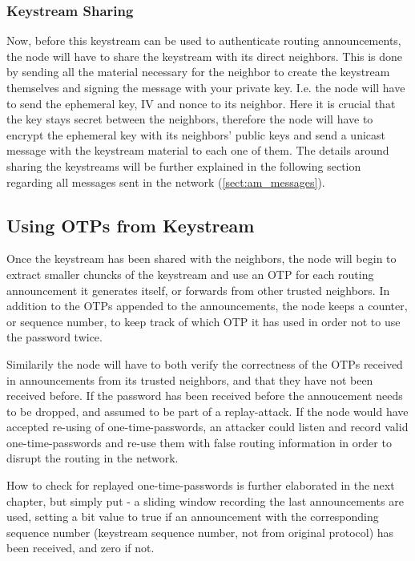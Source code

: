 \subsubsection*{Keystream Sharing}
Now, before this keystream can be used to authenticate routing announcements,
the node will have to share the keystream with its direct neighbors. This is
done by sending all the material necessary for the neighbor to create the
keystream themselves and signing the message with your private key. I.e. the
node will have to send the ephemeral key, \ac{IV} and nonce to its neighbor.
Here it is crucial that the key stays secret between the neighbors, therefore
the node will have to encrypt the ephemeral key with its neighbors' public keys
and send a unicast message with the keystream material to each one of them. The
details around sharing the keystreams will be further explained in the
following section regarding all messages sent in the network
(\ref{sect:am_messages}).

\subsection{Using \acfp{OTP} from Keystream}
Once the keystream has been shared with the neighbors, the node will begin to
extract smaller chuncks of the keystream and use an \ac{OTP} for each
routing announcement it generates itself, or forwards from other trusted
neighbors. In addition to the \acp{OTP} appended to the announcements,
the node keeps a counter, or sequence number, to keep track of which
\ac{OTP} it has used in order not to use the password twice.

Similarily the node will have to both verify the correctness of the \acp{OTP}
received in announcements from its trusted neighbors, and that they have not
been received before. If the password has been received before the annoucement
needs to be dropped, and assumed to be part of a replay-attack. If the node
would have accepted re-using of one-time-passwords, an attacker could listen
and record valid one-time-passwords and re-use them with false routing
information in order to disrupt the routing in the network.

How to check for replayed one-time-passwords is further elaborated in the next
chapter, but simply put - a sliding window recording the last announcements are
used, setting a bit value to true if an announcement with the corresponding
sequence number (keystream sequence number, not from original protocol) has been
received, and zero if not.

